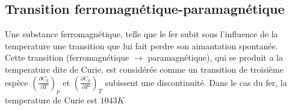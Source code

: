 \documentclass[12pt,oneside]{book}
\begin{document}
\subsection{Transition ferromagnétique-paramagnétique}
    Une substance ferromagnétique, telle que le fer subit sous l’influence de la temperature une transition que lui fait perdre son aimantation spontanée. \\
    Cette transition (ferromagnétique $\to$ paramagnétique), qui se produit a la temperature dite de Curie, est considérée comme un transition de troisième espèce $(\frac{\partial C_p}{\partial T})_p$ et $(\frac{\partial C_p}{\partial P})_T$ subissent une discontinuité. Dans le cas du fer, la temperature de Curie est $1043 K$
\end{document}
